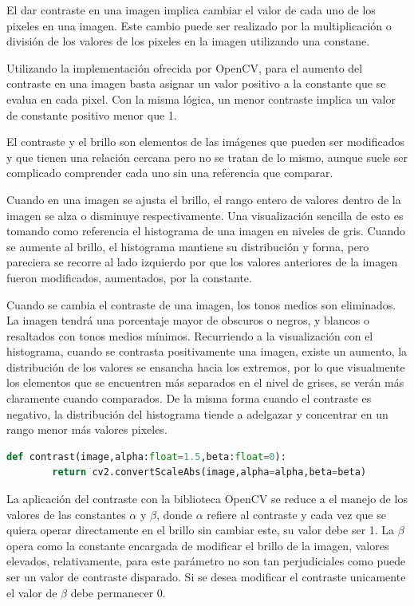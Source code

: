 \hfill\break
\justifying
El dar contraste en una imagen implica cambiar el valor de cada uno de los pixeles en una imagen. Este cambio puede ser realizado por la multiplicación o división de los valores de los pixeles en la imagen utilizando una constane.

\hfill\break
\justifying
Utilizando la implementación ofrecida por OpenCV, para el aumento del contraste en una imagen basta asignar un valor positivo a la constante que se evalua en cada pixel. Con la misma lógica, un menor contraste implica un valor de constante positivo menor que 1.

\hfill\break
\justifying
El contraste y el brillo son elementos de las imágenes que pueden ser modificados y que tienen una relación cercana pero no se tratan de lo mismo, aunque suele ser complicado comprender cada uno sin una referencia que comparar.

\hfill\break
\justifying
Cuando en una imagen se ajusta el brillo, el rango entero de valores dentro de la imagen se alza o disminuye respectivamente. Una visualización sencilla de esto es tomando como referencia el histograma de una imagen en niveles de gris. Cuando se aumente al brillo, el histograma mantiene su distribución y forma, pero pareciera se recorre al lado izquierdo por que los valores anteriores de la imagen fueron modificados, aumentados, por la constante.

\hfill\break
\justifying
Cuando se cambia el contraste de una imagen, los tonos medios son eliminados. La imagen tendrá una porcentaje mayor de obscuros o negros, y blancos o resaltados con tonos medios mínimos. Recurriendo a la visualización con el histograma, cuando se contrasta positivamente una imagen, existe un aumento, la distribución de los valores se ensancha hacia los extremos, por lo que visualmente los elementos que se encuentren más separados en el nivel de grises, se verán más claramente cuando comparados. De la misma forma cuando el contraste es negativo, la distribución del histograma tiende a adelgazar y concentrar en un rango menor más valores pixeles.

\begin{lstlisting}[language=Python]
	def contrast(image,alpha:float=1.5,beta:float=0):
		return cv2.convertScaleAbs(image,alpha=alpha,beta=beta)
\end{lstlisting}

\hfill\break
\justifying
La aplicación del contraste con la biblioteca OpenCV se reduce a el manejo de los valores de las constantes $\alpha$ y $\beta$, donde $\alpha$ refiere al contraste y cada vez que se quiera operar directamente en el brillo sin cambiar este, su valor debe ser 1. La $\beta$ opera como la constante encargada de modificar el brillo de la imagen, valores elevados, relativamente, para este parámetro no son tan perjudiciales como puede ser un valor de contraste disparado. Si se desea modificar el contraste unicamente el valor de $\beta$ debe permanecer 0.

